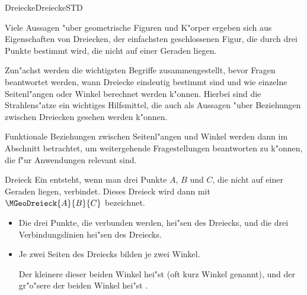 \begin{MXContent}{Dreiecke}{Dreiecke}{STD}

Viele Aussagen "uber geometrische Figuren und K"orper ergeben sich aus 
Eigenschaften von Dreiecken, der {\glqq}einfachsten geschlossenen Figur{\grqq}, 
die durch drei Punkte bestimmt wird, die nicht auf einer Geraden liegen. 


Zun"achst werden die wichtigsten Begriffe zusammengestellt, bevor Fragen 
beantwortet werden, wann Dreiecke eindeutig bestimmt sind und wie einzelne 
Seitenl"angen oder Winkel berechnet werden k"onnen. 
Hierbei sind die Strahlens"atze ein wichtiges Hilfsmittel, die auch als 
Aussagen "uber Beziehungen zwischen Dreiecken gesehen werden k"onnen.

Funktionale Beziehungen 
zwischen Seitenl"angen und Winkel werden dann im Abschnitt
 betrachtet, um weitergehende Fragestellungen 
beantworten zu k"onnen, die f"ur Anwendungen relevant sind.

\begin{MXInfo}{Dreieck}%
Ein  entsteht, wenn man drei Punkte $A$, $B$ und $C$, 
die nicht auf einer Geraden liegen, verbindet. Dieses Dreieck wird dann mit 
$\MGeoDreieck{A}{B}{C}$ bezeichnet.
\begin{itemize}
 \item Die drei Punkte, die verbunden werden, hei"sen
        des Dreiecks, und
       die drei Verbindungslinien hei"sen
        des Dreiecks.
       
 \item Je zwei Seiten des Dreiecks bilden je zwei Winkel.
   
       Der kleinere dieser beiden Winkel hei"st
        (oft kurz Winkel genannt),
       und der gr"o"sere der beiden Winkel hei"st
       .
 

\end{itemize}
\end{MXInfo}
\end{MXContent}
